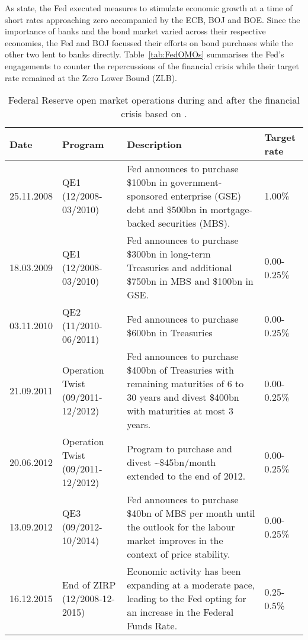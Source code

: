 As \textcite{Fawley.2013} state, the Fed executed measures to stimulate economic growth at a time of short rates approaching zero accompanied by the ECB, BOJ and BOE. Since the importance of banks and the bond market varied across their respective economies, the Fed and BOJ focussed their efforts on bond purchases while the other two lent to banks directly. Table~\vref{tab:FedOMOs} summarises the Fed's engagements to counter the repercussions of the financial crisis while their target rate remained at the Zero Lower Bound (ZLB). 
%
%
\begin{sidewaystable}[htbp]
	\small
	\caption[Important Announcements by the Federal Reserve]{Federal Reserve open market operations during and after the financial crisis based on \textcite[p.~61]{Fawley.2013}.}
	\label{tab:FedOMOs}
	\centering
	\begin{tabular}{ll p{8cm}l}
		\toprule
		Date & Program & Description & Target rate  \\
		\midrule
		25.11.2008 & QE1 (12/2008-03/2010) & Fed announces to purchase \$100bn in government-sponsored enterprise (GSE) debt and \$500bn
			in mortgage-backed securities (MBS). & 1.00\% \\
		18.03.2009 & QE1 (12/2008-03/2010) & Fed announces to purchase \$300bn in long-term Treasuries and additional \$750bn in MBS and \$100bn in GSE. & 0.00-0.25\% \\
		03.11.2010 & QE2 (11/2010-06/2011) & Fed announces to purchase \$600bn in Treasuries &  0.00-0.25\% \\
		21.09.2011 & Operation Twist (09/2011-12/2012) & Fed announces to purchase \$400bn of Treasuries with remaining maturities of 6 to 30 years and divest \$400bn with maturities at most 3 years. & 0.00-0.25\% \\
		20.06.2012 & Operation Twist (09/2011-12/2012) & Program to purchase and divest \textasciitilde\$45bn/month extended to the end of 2012. & 0.00-0.25\% \\
 		13.09.2012 & QE3 (09/2012-10/2014)& Fed announces to purchase \$40bn of MBS per month until the outlook for the labour market improves in the context of price stability. & 0.00-0.25\% \\
 		16.12.2015 & End of ZIRP (12/2008-12-2015) & Economic activity has been expanding at a moderate pace, leading to the Fed opting for an increase in the Federal Funds Rate. & 0.25-0.5\% \\
		\bottomrule
	\end{tabular}
\end{sidewaystable}
%

